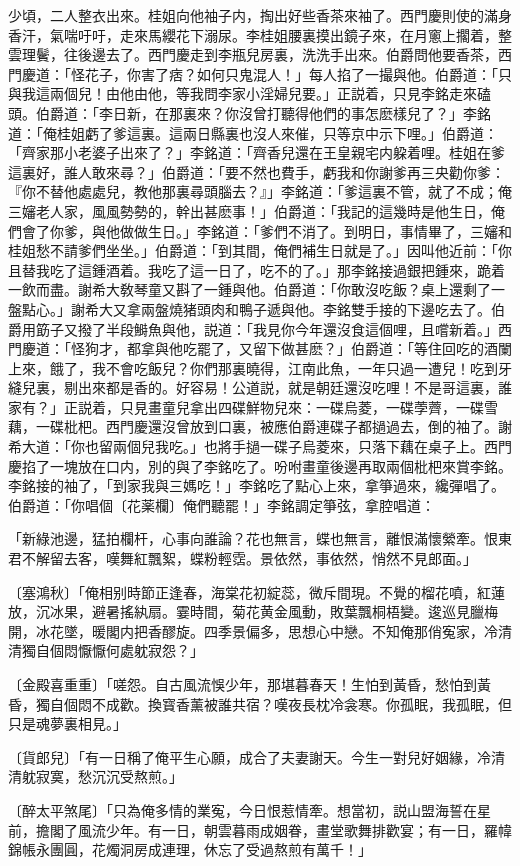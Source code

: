 少頃，二人整衣出來。桂姐向他袖子内，掏出好些香茶來袖了。西門慶則使的滿身香汗，氣喘吁吁，走來馬纓花下溺尿。李桂姐腰裏摸出鏡子來，在月窻上擱着，整雲理鬢，往後邊去了。西門慶走到李瓶兒房裏，洗洗手出來。伯爵問他要香茶，西門慶道：「怪花子，你害了痞？如何只鬼混人！」每人掐了一撮與他。伯爵道：「只與我這兩個兒！由他由他，等我問李家小淫婦兒要。」正説着，只見李銘走來磕頭。伯爵道：「李日新，在那裏來？你沒曾打聽得他們的事怎麽樣兒了？」李銘道：「俺桂姐虧了爹這裏。這兩日縣裏也沒人來催，只等京中示下哩。」伯爵道：「齊家那小老婆子出來了？」李銘道：「齊香兒還在王皇親宅内躱着哩。桂姐在爹這裏好，誰人敢來尋？」伯爵道：「要不然也費手，虧我和你謝爹再三央勸你爹：『你不替他處處兒，教他那裏尋頭腦去？』」李銘道：「爹這裏不管，就了不成；俺三嬸老人家，風風勢勢的，幹出甚麽事！」伯爵道：「我記的這幾時是他生日，俺們會了你爹，與他做做生日。」李銘道：「爹們不消了。到明日，事情畢了，三嬸和桂姐愁不請爹們坐坐。」伯爵道：「到其間，俺們補生日就是了。」因叫他近前：「你且替我吃了這鍾酒着。我吃了這一日了，吃不的了。」那李銘接過銀把鍾來，跪着一飲而盡。謝希大敎琴童又斟了一鍾與他。伯爵道：「你敢沒吃飯？桌上還剩了一盤點心。」謝希大又拿兩盤燒猪頭肉和鴨子遞與他。李銘雙手接的下邊吃去了。伯爵用筯子又撥了半段鰣魚與他，説道：「我見你今年還沒食這個哩，且嚐新着。」西門慶道：「怪狗才，都拿與他吃罷了，又留下做甚麽？」伯爵道：「等住回吃的酒闌上來，餓了，我不會吃飯兒？你們那裏曉得，江南此魚，一年只過一遭兒！吃到牙縫兒裏，剔出來都是香的。好容易！公道説，就是朝廷還沒吃哩！不是哥這裏，誰家有？」正説着，只見畫童兒拿出四碟鮮物兒來：一碟烏菱，一碟荸薺，一碟雪藕，一碟枇杷。西門慶還沒曾放到口裏，被應伯爵連碟子都撾過去，倒的袖了。謝希大道：「你也留兩個兒我吃。」也將手撾一碟子烏菱來，只落下藕在桌子上。西門慶掐了一塊放在口内，別的與了李銘吃了。吩咐畫童後邊再取兩個枇杷來賞李銘。李銘接的袖了，「到家我與三媽吃！」李銘吃了點心上來，拿箏過來，纔彈唱了。伯爵道：「你唱個〔花薬欄〕俺們聽罷！」李銘調定箏弦，拿腔唱道：

\begin{myquote}
「新綠池邊，猛拍欄杆，心事向誰論？花也無言，蝶也無言，離恨滿懷縈牽。恨東君不解留去客，嘆舞紅飄絮，蝶粉輕霑。景依然，事依然，悄然不見郎面。」

{\markfont〔塞鴻秋〕}「俺相别時節正逢春，海棠花初綻蕊，微斥間現。不覺的榴花噴，紅蓮放，沉冰果，避暑搖紈扇。霎時間，菊花黄金風動，敗葉飄桐梧變。逡巡見臘梅開，冰花墜，暖閣内把香醪旋。四季景偏多，思想心中戀。不知俺那俏寃家，冷清清獨自個悶懨懨何處躭寂怨？」

{\markfont〔金殿喜重重〕}「嗟怨。自古風流悞少年，那堪暮春天！生怕到黃昏，愁怕到黃昏，獨自個悶不成歡。換寳香薰被誰共宿？嘆夜長枕冷衾寒。你孤眠，我孤眠，但只是魂夢裏相見。」

{\markfont〔貨郎兒〕}「有一日稱了俺平生心願，成合了夫妻謝天。今生一對兒好姻緣，冷清清躭寂寞，愁沉沉受熬煎。」

{\markfont〔醉太平煞尾〕}「只為俺多情的業寃，今日恨惹情牽。想當初，説山盟海誓在星前，擔閣了風流少年。有一日，朝雲暮雨成姻眷，畫堂歌舞排歡宴；有一日，羅幃錦帳永團圓，花燭洞房成連理，休忘了受過熬煎有萬千！」
\end{myquote}

